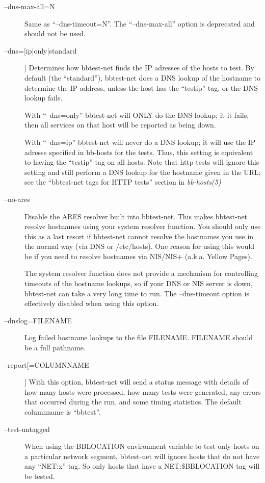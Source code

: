 \begin{description}
\item[--dns-max-all=N] Same as ``--dns-timeout=N''. The
  ``--dns-max-all'' option is deprecated and should not be used. 
 

\item[--dns=[ip|only|standard]] Determines how bbtest-net finds the IP
  adresses of the hosts to test. By default (the ``standard''),
  bbtest-net does a DNS lookup of the hostname to determine the IP
  address, unless the host has the ``testip'' tag, or the DNS lookup
  fails.  

 With ``--dns=only'' bbtest-net will ONLY do the DNS lookup; it it
 fails, then all services on that host will be reported as being down.  

 With ``--dns=ip'' bbtest-net will never do a DNS lookup; it will use
 the IP adresse specified in bb-hosts for the tests. Thus, this
 setting is equivalent to having the ``testip'' tag on all hosts. Note
 that http tests will ignore this setting and still perform a DNS
 lookup for the hostname given in the URL; see the ``bbtest-net tags
 for HTTP tests'' section in \emph{bb-hosts(5)}

\item[--no-ares] Disable the ARES resolver built into bbtest-net. This
  makes bbtest-net resolve hostnames using your system resolver
  function. You should only use this as a last resort if bbtest-net
  cannot resolve the hostnames you use in the normal way (via DNS or
  /etc/hosts). One reason for using this would be if you need to
  resolve hostnames via NIS/NIS+ (a.k.a. Yellow Pages).  

 The system resolver function does not provide a mechanism for
 controlling timeouts of the hostname lookups, so if your DNS or NIS
 server is down, bbtest-net can take a very long time to run. The
 --dns-timeout option is effectively disabled when using this option. 
 

\item[--dnslog=FILENAME] Log failed hostname lookups to the file
  FILENAME. FILENAME should be a full pathname. 

\item[--report[=COLUMNNAME]] With this option, bbtest-net will send a
  status message with details of how many hosts were processed, how
  many tests were generated, any errors that occurred during the run,
  and some timing statistics. The default columnname is ``bbtest''. 

\item[--test-untagged] When using the BBLOCATION environment variable
  to test only hosts on a particular network segment, bbtest-net will
  ignore hosts that do not have any ``NET:x'' tag. So only hosts that
  have a NET:\$BBLOCATION tag will be tested.  


\end{description}
